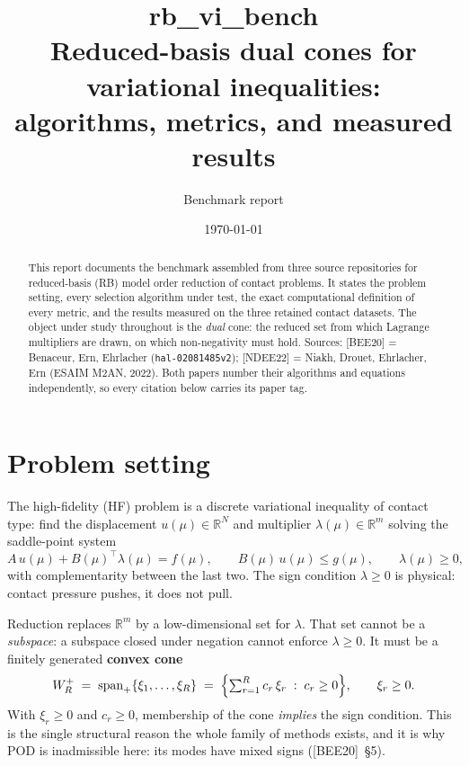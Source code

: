 \documentclass[11pt,a4paper]{article}
\title{\textbf{rb\_vi\_bench}\\[2mm]
\large Reduced-basis dual cones for variational inequalities:\\
algorithms, metrics, and measured results}
\author{Benchmark report}
\date{\today}
\newcommand{\spanp}{\operatorname{span}_+}
\newcommand{\R}{\mathbb{R}}
\newcommand{\bee}{\textsf{[BEE20]}}
\newcommand{\ndee}{\textsf{[NDEE22]}}
\begin{document}
\maketitle

\begin{abstract}
\noindent
This report documents the benchmark assembled from three source repositories for
reduced-basis (RB) model order reduction of contact problems. It states the problem
setting, every selection algorithm under test, the exact computational definition of
every metric, and the results measured on the three retained contact datasets. The
object under study throughout is the \emph{dual} cone: the reduced set from which
Lagrange multipliers are drawn, on which non-negativity must hold.
Sources: \bee{} = Benaceur, Ern, Ehrlacher (\texttt{hal-02081485v2});
\ndee{} = Niakh, Drouet, Ehrlacher, Ern (ESAIM M2AN, 2022). Both papers number their
algorithms and equations independently, so every citation below carries its paper tag.
\end{abstract}

\section{Problem setting}

The high-fidelity (HF) problem is a discrete variational inequality of contact type: find
the displacement $u(\mu)\in\R^{N}$ and multiplier $\lambda(\mu)\in\R^{m}$ solving the
saddle-point system
\begin{equation}
A\,u(\mu) + B(\mu)^{\!\top}\lambda(\mu) = f(\mu), \qquad
B(\mu)\,u(\mu) \le g(\mu), \qquad
\lambda(\mu)\ge 0 ,
\label{eq:hf}
\end{equation}
with complementarity between the last two. The sign condition $\lambda\ge 0$ is physical:
contact pressure pushes, it does not pull.

Reduction replaces $\R^{m}$ by a low-dimensional set for $\lambda$. That set cannot be a
\emph{subspace}: a subspace closed under negation cannot enforce $\lambda\ge 0$. It must
be a finitely generated \textbf{convex cone}
\begin{equation}
W_R^{+} \;=\; \spanp\{\xi_1,\dots,\xi_R\}
\;=\;\Bigl\{\textstyle\sum_{r=1}^{R} c_r\,\xi_r \;:\; c_r\ge 0\Bigr\},
\qquad \xi_r \ge 0 .
\label{eq:cone}
\end{equation}
With $\xi_r\ge0$ and $c_r\ge0$, membership of the cone \emph{implies} the sign condition.
This is the single structural reason the whole family of methods exists, and it is why
POD is inadmissible here: its modes have mixed signs (\bee{}~\S5).
\end{document}

